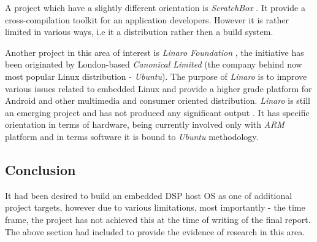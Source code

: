   A project which have a slightly different orientation is
 \emph{ScratchBox} \cite{links:sbox:homepage}. It provide a
 cross-compilation toolkit for an application developers.
 However it is rather limited in various ways, i.e it a
 distribution rather then a build system.
 
  Another project in this area of interest is \emph{Linaro Foundation}
 \cite{links:linaro:about}, the initiative has been originated by
 London-based \emph{Canonical Limited} (the company behind now most
 popular Linux distribution - \emph{Ubuntu}).
 The purpose of \emph{Linaro} is to improve various issues related to
 embedded Linux and provide a higher grade platform for Android and
 other multimedia and consumer oriented distribution. \emph{Linaro} is
 still an emerging project and has not produced any significant output
 \cite{links:linaro:homepage}. It has specific orientation in terms of
 hardware, being currently involved only with \emph{ARM} platform and
 in terms software it is bound to \emph{Ubuntu} methodology.

\subsection{Conclusion}

  It had been desired to build an embedded DSP host OS as one of
 additional project targets, however due to various limitations, most
 importantly - the time frame, the project has not achieved this at
 the time of writing of the final report. The above section had included
 to provide the evidence of research in this area.






